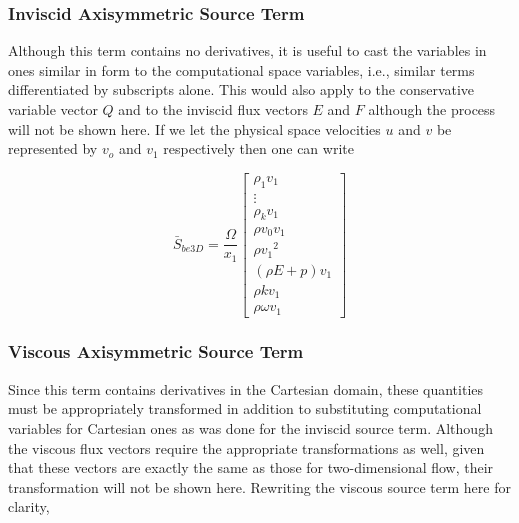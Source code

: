 \subsubsection{Inviscid Axisymmetric Source Term}

	Although this term contains no derivatives, it is useful to cast the variables in ones similar in form
to the computational space variables, i.e., similar terms differentiated by subscripts alone.  This would also
apply to the conservative variable vector $Q$ and to the inviscid flux vectors $E$ and $F$ although the process 
will not be shown here.  If we let the physical space velocities $u$ and $v$ be represented by $v_o$ and $v_1$ 
respectively then one can write

\begin{equation}
	\bar{S}_{be3D} = \frac{\Omega}{x_1}\left[ \begin{array}{c}
		\rho_1 v_1 \\
		\vdots \\
		\rho_k v_1 \\
		\rho v_0v_1 \\
		\rho {v_1}^2 \\
		(\rho E + p)v_1 \\
		\rho k v_1 \\
		\rho \omega v_1
		   \end{array}
	    \right]
\label{eqn:finalHbar}
\end{equation}


\subsubsection{Viscous Axisymmetric Source Term}

	Since this term contains derivatives in the Cartesian domain, these quantities must be appropriately
transformed in addition to substituting computational variables for Cartesian ones as was done for the inviscid source
term.  Although the viscous flux vectors require the appropriate transformations as well, given that these vectors
are exactly the same as those for two-dimensional flow, their transformation will not be shown here.  Rewriting the 
viscous source term here for clarity,


